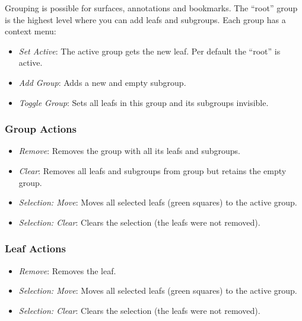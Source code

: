 
Grouping is possible for surfaces, annotations and bookmarks.
The ``root'' group is the highest level where you can add leafs and subgroups.
Each group has a context menu:
\begin{itemize}
	\item \textit{Set Active}: The active group gets the new leaf. Per default the ``root'' is active.
	\item \textit{Add Group}: Adds a new and empty subgroup.
	\item \textit{Toggle Group}: Sets all leafs in this group and its subgroups invisible.
\end{itemize}

\subsubsection{Group Actions}
\label{sec:groupActions}

\begin{itemize}
	\item \textit{Remove}: Removes the group with all its leafs and subgroups.
	\item \textit{Clear}: Removes all leafs and subgroups from group but retains the empty group. 
	\item \textit{Selection: Move}: Moves all selected leafs (green squares) to the active group.
	\item \textit{Selection: Clear}: Clears the selection (the leafs were not removed).
\end{itemize}
	
\subsubsection{Leaf Actions}
\label{sec:leafActions}

\begin{itemize}
	\item \textit{Remove}: Removes the leaf.
	\item \textit{Selection: Move}: Moves all selected leafs (green squares) to the active group.
	\item \textit{Selection: Clear}: Clears the selection (the leafs were not removed).
\end{itemize}

